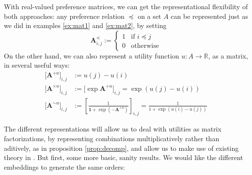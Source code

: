 \documentclass{article}
\theoremstyle{plain}
\theoremstyle{definition}
\theoremstyle{remark}
\newcommand\leqc{\preccurlyeq}
\newcommand\mat[1]{\mathbf #1}
\begin{document}
	With real-valued preference matrices, we can get the representational flexibility of both approaches: any preference relation $\leqc$ on a set $A$ can be represented just as we did in examples \ref{ex:mat1} and \ref{ex:mat2}, by setting
	\[ \mat A^\leqc_{i,j} := \begin{cases} 1 & \text{if $i \leqc j$} \\ 0 & \text{otherwise}\end{cases}\]
	On the other hand, we can also represent a utility function $u : A \to \mathbb R$, as a matrix, in several useful ways:
	\begin{align*}
		\big[\mat A^{+ u}\big]_{i,j} &:=   u(j) - u(i) 	\\[0.3em]
		\big[\mat A^{\times u}\big]_{i,j} &:= \big[\exp \mat A^{+u}\big]_{i,j} = \exp ( u(j) - u(i) ) \\[0.3em]
		\big[\mat A^{\sim u}\big]_{i,j} &:= \left[\frac{1}{\mat 1 + \exp(- \mat A^{+ u})}\right]_{i,j} = \frac{1}{1+\exp ( u(i) - u(j) )}
	\end{align*}

	The different representations will allow us to deal with utilities as matrix factorizations, by representing combinations multiplicatively rather than aditively, as in proposition \ref{prop:decomp}, and allow us to make use of existing theory in \cite{elsner2004max}. But first, some more basic, sanity results. We would like the different embeddings to generate the same orders:
\end{document}
